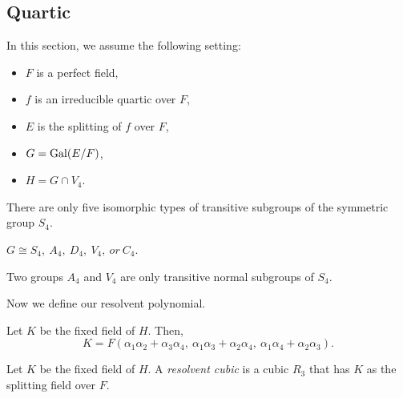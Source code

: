 \documentclass{../exp}
\begin{document}
\subsection{Quartic}
In this section, we assume the following setting:
\begin{itemize}
\item $F$ is a perfect field, %
\item $f$ is an irreducible quartic over $F$,
\item $E$ is the splitting of $f$ over $F$,
\item $G=\operatorname{Gal}(E/F)$,
\item $H=G\cap V_4$. 
\end{itemize}
\begin{thm}
There are only five isomorphic types of transitive subgroups of the symmetric group $S_4$.
\end{thm}
\begin{cor}
$G\cong S_4,\ A_4,\ D_4,\ V_4,\ or\ C_4$.
\end{cor}
\begin{prop}
Two groups $A_4$ and $V_4$ are only transitive normal subgroups of $S_4$.
\end{prop}

Now we define our resolvent polynomial.
\begin{prop}
Let $K$ be the fixed field of $H$.
Then,
\[K=F(\alpha_1\alpha_2+\alpha_3\alpha_4,\ \alpha_1\alpha_3+\alpha_2\alpha_4,\ \alpha_1\alpha_4+\alpha_2\alpha_3).\]
\end{prop}
\begin{defn}
Let $K$ be the fixed field of $H$.
A \emph{resolvent cubic} is a cubic $R_3$ that has $K$ as the splitting field over $F$.
\end{defn}
\end{document}
